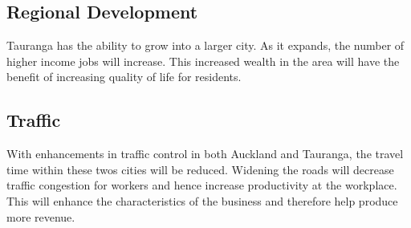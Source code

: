 \subsection*{Regional Development}
Tauranga has the ability to grow into a larger city. As it expands, the number of higher income jobs will increase. This increased wealth in the area will have the benefit of increasing quality of life for residents.

\subsection*{Traffic}
With enhancements in traffic control in both Auckland and Tauranga, the travel time within these twos cities will be reduced. Widening the roads will decrease traffic congestion for workers and hence increase productivity at the workplace. This will enhance the characteristics of the business and therefore help produce more revenue.


\clearpage